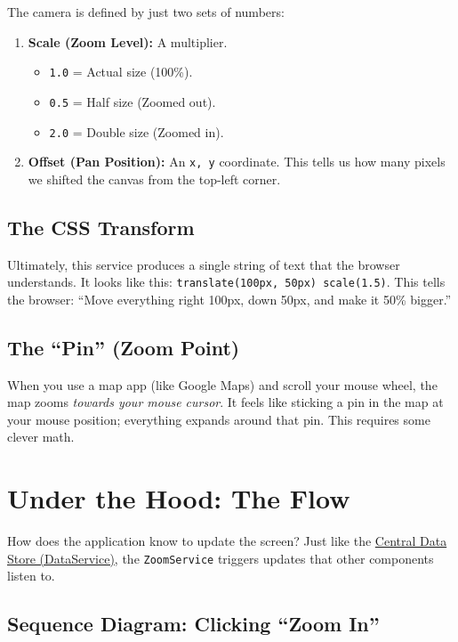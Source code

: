 \documentclass[a4paper,11pt,oneside]{report}
\begin{document}
The camera is defined by just two sets of numbers:
\begin{enumerate}
    \item \textbf{Scale (Zoom Level):} A multiplier.
    \begin{itemize}
        \item \texttt{1.0} = Actual size (100\%).
        \item \texttt{0.5} = Half size (Zoomed out).
        \item \texttt{2.0} = Double size (Zoomed in).
    \end{itemize}
    \item \textbf{Offset (Pan Position):} An \texttt{x, y} coordinate. This tells us how many pixels we shifted the canvas from the top-left corner.
\end{enumerate}

\subsection{The CSS Transform}

Ultimately, this service produces a single string of text that the browser understands.
It looks like this: \texttt{translate(100px, 50px) scale(1.5)}. This tells the browser: ``Move everything right 100px, down 50px, and make it 50\% bigger.''

\subsection{The ``Pin'' (Zoom Point)}

When you use a map app (like Google Maps) and scroll your mouse wheel, the map zooms \emph{towards your mouse cursor}. It feels like sticking a pin in the map at your mouse position; everything expands around that pin. This requires some clever math.

\section{Under the Hood: The Flow}

How does the application know to update the screen? Just like the \hyperref[chap:dataservice]{Central Data Store (DataService)}, the \texttt{ZoomService} triggers updates that other components listen to.

\subsection{Sequence Diagram: Clicking ``Zoom In''}
\end{document}
